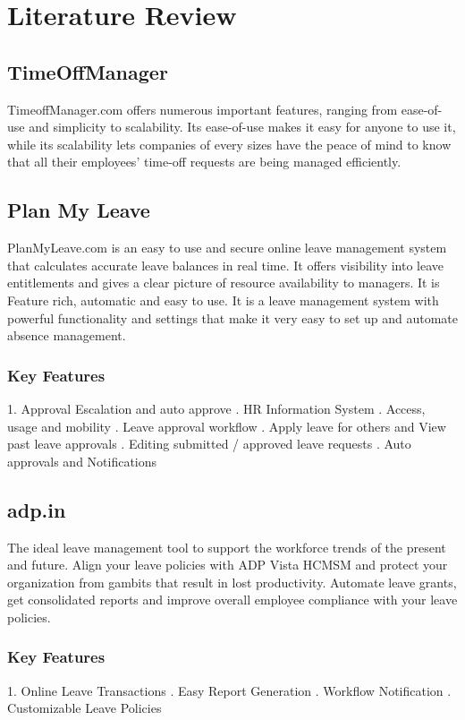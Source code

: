 \section{Literature Review}
\subsection{TimeOffManager}
\noindent
TimeoffManager.com offers numerous important features, ranging from ease-of-use and simplicity to scalability. Its ease-of-use makes it easy for anyone to use it, while its scalability lets companies of every sizes have the peace of mind to know that all their employees’ time-off requests are being managed efficiently.

\subsection{Plan My Leave}
\noindent
PlanMyLeave.com is an easy to use and secure online leave management system that calculates
accurate leave balances in real time. It offers visibility into leave entitlements and gives a
clear picture of resource availability to managers. It is Feature rich, automatic and easy to
use. It is a leave management system with powerful functionality and settings that make it
very easy to set up and automate absence management.

\subsubsection{Key Features}
1. Approval Escalation and auto approve . HR Information System . Access, usage and mobility . Leave approval workflow . Apply leave for others and View past leave approvals . Editing submitted / approved leave requests . Auto approvals and Notifications \newline

\subsection{adp.in}
The ideal leave management tool to support the workforce trends of the present and future.
Align your leave policies with ADP Vista HCMSM and protect your organization from gambits that result in lost productivity. Automate leave grants, get consolidated reports and improve overall employee compliance with your leave policies.

\subsubsection{Key Features}
1. Online Leave Transactions . Easy Report Generation . Workflow Notification . Customizable Leave Policies
